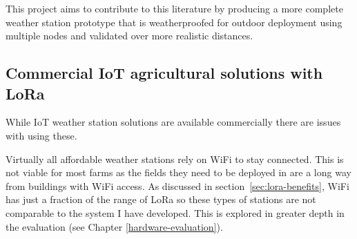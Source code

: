 This project aims to contribute to this literature by producing a more complete
weather station prototype that is weatherproofed for outdoor deployment using
multiple nodes and validated over more realistic distances.


\subsection{Commercial IoT agricultural solutions with LoRa}

While IoT weather station solutions are available commercially there are issues
with using these.

Virtually all affordable weather stations rely on WiFi to stay connected. This
is not viable for most farms as the fields they need to be deployed in are a
long way from buildings with WiFi access. As discussed in
section~\ref{sec:lora-benefits}, WiFi has just a fraction of the range of LoRa
so these types of stations are not comparable to the system I have developed.
This is explored in greater depth in the evaluation (see Chapter
\ref{hardware-evaluation}).
